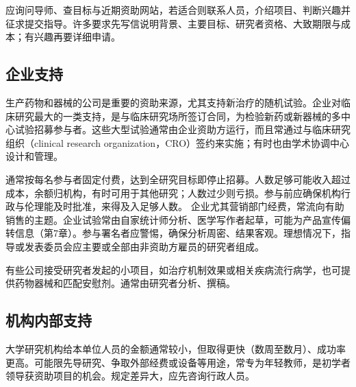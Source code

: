 应询问导师、查目标与近期资助网站，若适合则联系人员，介绍项目、判断兴趣并征求提交指导。许多要求先写信说明背景、主要目标、研究者资格、大致期限与成本；有兴趣再要详细申请。

\subsection{企业支持}
生产药物和器械的公司是重要的资助来源，尤其支持新治疗的随机试验。企业对临床研究最大的一类支持，是与临床研究场所签订合同，为检验新药或新器械的多中心试验招募参与者。这些大型试验通常由企业资助方运行，而且常通过与临床研究组织（clinical research organization，CRO）签约来实施；有时也由学术协调中心设计和管理。

通常按每名参与者固定付费，达到全研究目标即停止招募。人数足够可能收入超过成本，余额归机构，有时可用于其他研究；人数过少则亏损。参与前应确保机构行政与伦理能及时批准，来得及入足够人数。
企业尤其营销部门经费，常流向有助销售的主题。企业试验常由自家统计师分析、医学写作者起草，可能为产品宣传偏转信息（第7章）。参与署名者应警惕，确保分析周密、结果客观。理想情况下，指导或发表委员会应主要或全部由非资助方雇员的研究者组成。

有些公司接受研究者发起的小项目，如治疗机制效果或相关疾病流行病学，也可提供药物器械和匹配安慰剂。通常由研究者分析、撰稿。

\subsection{机构内部支持}
大学研究机构给本单位人员的金额通常较小，但取得更快（数周至数月）、成功率更高。可能限先导研究、争取外部经费或设备等用途，常专为年轻教师，是初学者领导获资助项目的机会。规定差异大，应先咨询行政人员。

